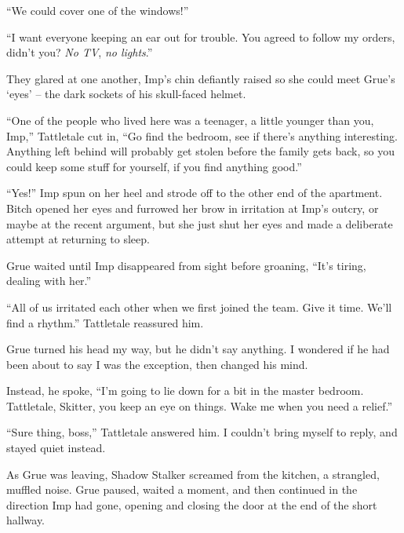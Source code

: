 ``We could cover one of the windows!''



``I want everyone keeping an ear out for trouble.  You agreed to follow my orders, didn't you?  \emph{No TV}, \emph{no lights}.''



They glared at one another, Imp's chin defiantly raised so she could meet Grue's `eyes' – the dark sockets of his skull-faced helmet.



``One of the people who lived here was a teenager, a little younger than you, Imp,'' Tattletale cut in, ``Go find the bedroom, see if there's anything interesting.  Anything left behind will probably get stolen before the family gets back, so you could keep some stuff for yourself, if you find anything good.''



``Yes!'' Imp spun on her heel and strode off to the other end of the apartment.  Bitch opened her eyes and furrowed her brow in irritation at Imp's outcry, or maybe at the recent argument, but she just shut her eyes and made a deliberate attempt at returning to sleep.



Grue waited until Imp disappeared from sight before groaning, ``It's tiring, dealing with her.''



``All of us irritated each other when we first joined the team.  Give it time.  We'll find a rhythm.'' Tattletale reassured him.



Grue turned his head my way, but he didn't say anything.  I wondered if he had been about to say I was the exception, then changed his mind.



Instead, he spoke, ``I'm going to lie down for a bit in the master bedroom.  Tattletale, Skitter, you keep an eye on things.  Wake me when you need a relief.''



``Sure thing, boss,'' Tattletale answered him.  I couldn't bring myself to reply, and stayed quiet instead.



As Grue was leaving, Shadow Stalker screamed from the kitchen, a strangled, muffled noise.  Grue paused, waited a moment, and then continued in the direction Imp had gone, opening and closing the door at the end of the short hallway.



